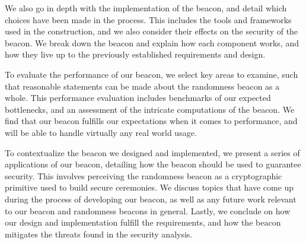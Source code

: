 We also go in depth with the implementation of the beacon, and detail which choices have been made in the process.
This includes the tools and frameworks used in the construction, and we also consider their effects on the security of the beacon.
We break down the beacon and explain how each component works, and how they live up to the previously established requirements and design.

\bigskip\noindent
To evaluate the performance of our beacon, we select key areas to examine, such that reasonable statements can be made about the randomness beacon as a whole.
This performance evaluation includes benchmarks of our expected bottlenecks, and an assessment of the intricate computations of the beacon.
We find that our beacon fulfills our expectations when it comes to performance, and will be able to handle virtually any real world usage.

To contextualize the beacon we designed and implemented, we present a series of applications of our beacon, detailing how the beacon should be used to guarantee security.
This involves perceiving the randomness beacon as a cryptographic primitive used to build secure ceremonies.
We discuss topics that have come up during the process of developing our beacon, as well as any future work relevant to our beacon and randomness beacons in general.
Lastly, we conclude on how our design and implementation fulfill the requirements, and how the beacon mitigates the threats found in the security analysis.
